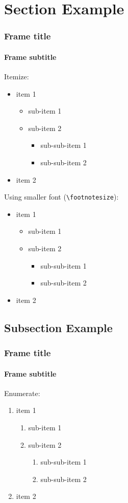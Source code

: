 \section[Section]{Section Example}
\begin{frame}[fragile]
  \frametitle{Frame title}
  \framesubtitle{Frame subtitle}

  Itemize:
  \begin{itemize}
    \item item 1
      \begin{itemize}
	\item sub-item 1
	\item sub-item 2
	  \begin{itemize}
	    \item sub-sub-item 1
	    \item sub-sub-item 2
	  \end{itemize}
      \end{itemize}
    \item item 2
  \end{itemize}
  
  \footnotesize
  Using smaller font (\verb+\footnotesize+):
  \begin{itemize}
    \item item 1
      \begin{itemize}
	\item sub-item 1
	\item sub-item 2
	  \begin{itemize}
	    \item sub-sub-item 1
	    \item sub-sub-item 2
	  \end{itemize}
      \end{itemize}
    \item item 2
  \end{itemize}

\end{frame}

\subsection[Subsection]{Subsection Example}
\begin{frame}
  \frametitle{Frame title}
  \framesubtitle{Frame subtitle}
  
  Enumerate:
  \begin{enumerate}
    \item item 1
      \begin{enumerate}
	\item sub-item 1
	\item sub-item 2
	  \begin{enumerate}
	    \item sub-sub-item 1
	    \item sub-sub-item 2
	  \end{enumerate}
      \end{enumerate}
    \item item 2
  \end{enumerate}
\end{frame}

